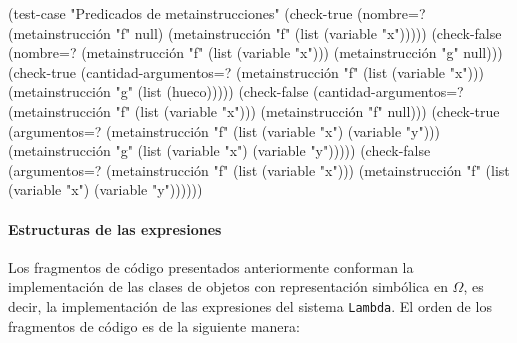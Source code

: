 \documentclass[10pt,oneside,openany,letterpaper]{book}
\begin{document}
\nwenddocs{}\plusendmoddef
(test-case "Predicados de metainstrucciones"
  (check-true (nombre=? (metainstrucción "f" null)
                        (metainstrucción "f" (list (variable "x")))))
  (check-false (nombre=? (metainstrucción "f" (list (variable "x")))
                         (metainstrucción "g" null)))
  (check-true (cantidad-argumentos=? (metainstrucción "f" (list (variable "x")))
                                     (metainstrucción "g" (list (hueco)))))
  (check-false (cantidad-argumentos=? (metainstrucción "f" (list (variable "x")))
                                      (metainstrucción "f" null)))
  (check-true (argumentos=? (metainstrucción "f" (list (variable "x")
                                                       (variable "y")))
                            (metainstrucción "g" (list (variable "x")
                                                       (variable "y")))))
  (check-false (argumentos=? (metainstrucción "f" (list (variable "x")))
                             (metainstrucción "f" (list (variable "x")
                                                        (variable "y"))))))
\nwendcode{}\nwdocspar


\paragraph{Estructuras de las expresiones} Los fragmentos de código presentados anteriormente conforman la implementación de las clases de objetos con representación simbólica en \( Ω \), es decir, la implementación de las expresiones del sistema {\tt{}Lambda}. El orden de los fragmentos de código es de la siguiente manera:
\end{document}
